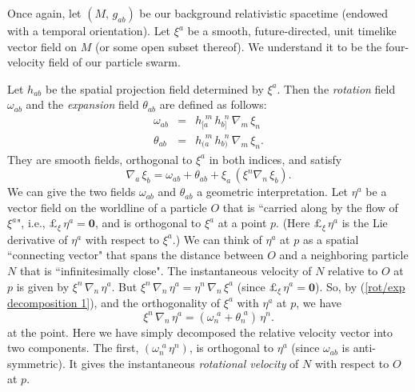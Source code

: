 \documentclass [12] {article}
\theoremstyle{plain}
\numberwithin{figure}{subsection}
\numberwithin{proposition}{subsection}
\begin{document}
Once again, let $(M, \,   g_{ab})$  be our background relativistic spacetime (endowed with a temporal orientation).  Let $\xi^a$ be a smooth, future-directed, unit timelike vector field on $M$ (or some open subset thereof).  We understand it to be the four-velocity field  of our particle swarm.

Let $h_{ab}$ be the spatial projection field determined by $\xi^a$. Then the \emph{rotation} field $\omega_{ab}$ and the \emph{expansion} field $\theta_{ab}$ are defined as follows:
\begin{eqnarray}
\omega_{ab} & = & h_{[a}^{\ \ m} \, h_{b]}^{\ \ n} \, \nabla_m \, \xi_n \\
\theta_{ab} & = & h_{(a}^{\ \ m} \, h_{b)}^{\ \ n} \, \nabla_m \, \xi_n. 
\end{eqnarray}
\noindent  They are smooth fields, orthogonal to $\xi^a$ in both indices,  and satisfy
\begin{equation}\label{rot/exp decomposition 1}
\nabla_a \, \xi_b =   \omega_{ab} +  \theta_{ab}  +  \xi_a \, (\xi^n \nabla_n \,  \xi_b).  
\end{equation} 
\indent We can give the two fields $\omega_{ab}$ and $\theta_{ab}$ a geometric interpretation. Let $\eta^a$ be a vector field on the worldline of a particle $O$ that is ``carried along by the flow of $\xi^{a}$", i.e.,  $\pounds_{\xi} \, \eta^a = \textbf{0}$, and is orthogonal to $\xi^a$ at a point $p$. (Here $\pounds_{\xi} \, \eta^a$ is the Lie derivative of $\eta^a$ with respect to $\xi^a$.) We can think of $\eta^a$ at $p$ as a spatial ``connecting vector" that spans the distance between $O$ and a neighboring particle $N$ that is ``infinitesimally close".
%
%		  
\noindent The instantaneous velocity of $N$ relative to $O$ at $p$ is given by $\xi^n \, \nabla_n \, \eta^a$.  But $\xi^n \, \nabla_n \, \eta^a = \eta^n \, \nabla_n \, \xi^a $  (since $\pounds_{\xi} \, \eta^a = \textbf{0}$).  So, by (\ref{rot/exp decomposition 1}), and the orthogonality of $\xi^a$ with $\eta^a$ at $p$, we have 
%
\begin{equation}\label{rot/exp decomposition 2}
\xi^n \, \nabla_n \, \eta^a  =   (\omega_{n}^{\ \, a }  +  \theta_{n}^{\ \, a }) \, \eta^n.
\end{equation} 
%
\noindent at the point. Here we have simply decomposed the relative velocity vector into two components. The first,  $(\omega_{n}^{\ \, a } \, \eta^n)$, is orthogonal to $\eta^a$ (since $\omega_{ab}$ is anti-symmetric).  It  gives the instantaneous \emph{rotational  velocity} of  $N$ with respect to $O$ at $p$. 
\end{document}
